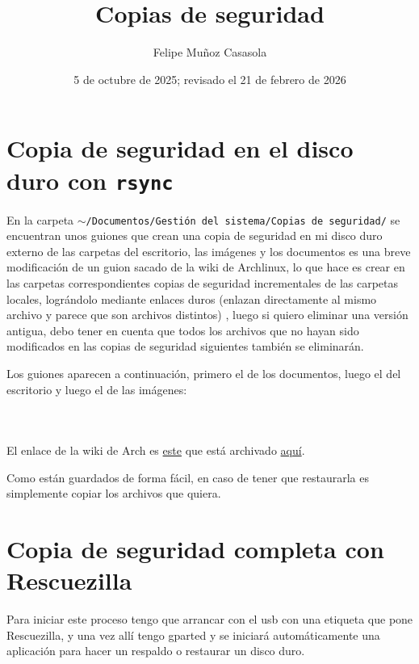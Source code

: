 \documentclass{article}
\title{Copias de seguridad}
\author{Felipe Muñoz Casasola}
\date{5 de octubre de 2025; revisado el 21 de febrero de 2026}
\begin{document}
    \maketitle
    \clearpage
    \tableofcontents
    \clearpage

    
    
    \section{Copia de seguridad en el disco duro con \texttt{rsync}}
    En la carpeta \texttt{$\sim$/Documentos/Gestión\- del sistema/Copias de seguridad/}
    se encuentran unos guiones que crean una copia de seguridad en mi disco
    duro externo de las carpetas del escritorio, las imágenes y los documentos
    es una breve modificación de un guion sacado de la wiki de Archlinux, lo
    que hace es crear en las carpetas correspondientes copias de seguridad
    incrementales de las carpetas locales, lográndolo mediante enlaces duros
    (enlazan directamente al mismo archivo y parece que son archivos distintos)
    , luego si quiero eliminar una versión antigua, debo tener en cuenta que
    todos los archivos que no hayan sido modificados en las copias de seguridad
    siguientes también se eliminarán.

    Los guiones aparecen a continuación, primero el de los documentos, luego
    el del escritorio y luego el de las imágenes:

    \inputminted[breaklines, breakanywhere, breaksymbolleft="", breaksymbolright="", breakanywheresymbolpre="", breakanywheresymbolpost=""]
    {bash}{inc/Copia de seguridad de documentos.sh}

    \inputminted[breaklines, breakanywhere, breaksymbolleft="", breaksymbolright="", breakanywheresymbolpre="", breakanywheresymbolpost=""]
    {bash}{inc/Copia de seguridad de escritorio.sh}

    \inputminted[breaklines, breakanywhere, breaksymbolleft="", breaksymbolright="", breakanywheresymbolpre="", breakanywheresymbolpost=""]
    {bash}{inc/Copia de seguridad de imágenes.sh}

    El enlace de la wiki de Arch es \href{https://wiki.archlinux.org/title/Rsync}{este}
    que está archivado \href{https://web.archive.org/web/20251005105853/https://wiki.archlinux.org/title/Rsync}{aquí}.

    Como están guardados de forma fácil, en caso de tener que restaurarla
    es simplemente copiar los archivos que quiera.
    
    \section{Copia de seguridad completa con Rescuezilla}
    Para iniciar este proceso tengo que arrancar con el usb con una etiqueta
    que pone Rescuezilla, y una vez allí tengo gparted y se iniciará
    automáticamente una aplicación para hacer un respaldo o restaurar un
    disco duro.
\end{document}

